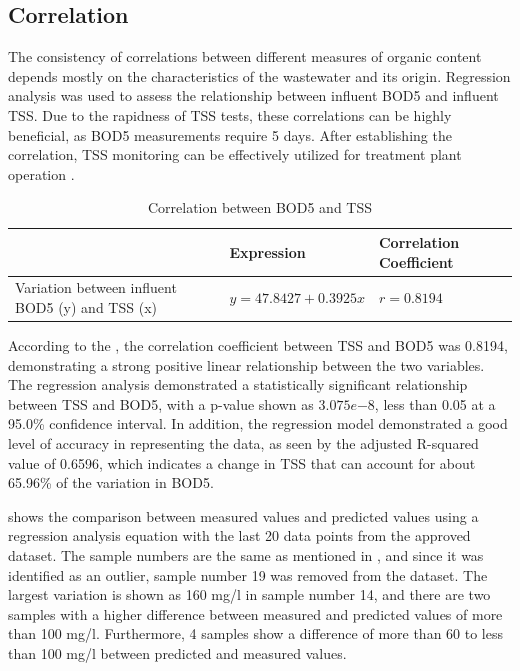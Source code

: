 

\subsection{Correlation}
The consistency of correlations between different measures of organic content depends mostly on the characteristics of the wastewater and its origin. Regression analysis was used to assess the relationship between influent \ac{BOD5} and influent \ac{TSS}. Due to the rapidness of \ac{TSS} tests, these correlations can be highly beneficial, as \ac{BOD5} measurements require 5 days. After establishing the correlation, \ac{TSS} monitoring can be effectively utilized for treatment plant operation \cite{Kumar2010}.

\begin{table}[H]
    \centering
    
\caption{Correlation between \ac{BOD5} and \ac{TSS}}
\label{tab:BOD_TSS_correlations}
    \begin{tabular}{|>{\raggedright\arraybackslash}p{5cm}|>{\centering\arraybackslash}p{5cm}|>{\centering\arraybackslash}p{4.5cm}|}
    \hline
          & Expression & Correlation Coefficient \\
          \hline
         Variation between influent \ac{BOD5} (y) and \ac{TSS} (x) & $y = 47.8427 + 0.3925x$  & $ r = 0.8194$ \\
         \hline
    \end{tabular}
\end{table}


According to the , the correlation coefficient between \ac{TSS} and \ac{BOD5} was 0.8194, demonstrating a strong positive linear relationship between the two variables. The regression analysis demonstrated a statistically significant relationship between \ac{TSS} and \ac{BOD5}, with a p-value shown as $3.075 e{-8}$, less than 0.05 at a 95.0\% confidence interval. In addition, the regression model demonstrated a good level of accuracy in representing the data, as seen by the adjusted R-squared value of 0.6596, which indicates a change in \ac{TSS} that can account for about 65.96\% of the variation in \ac{BOD5}. 



 shows the comparison between measured values and predicted values using a regression analysis equation with the last 20 data points from the approved dataset. The sample numbers are the same as mentioned in , and since it was identified as an outlier, sample number 19 was removed from the dataset. The largest variation is shown as 160 mg/l in sample number 14, and there are two samples with a higher difference between measured and predicted values of more than 100 mg/l. Furthermore, 4 samples show a difference of more than 60 to less than 100 mg/l between predicted and measured values. 



